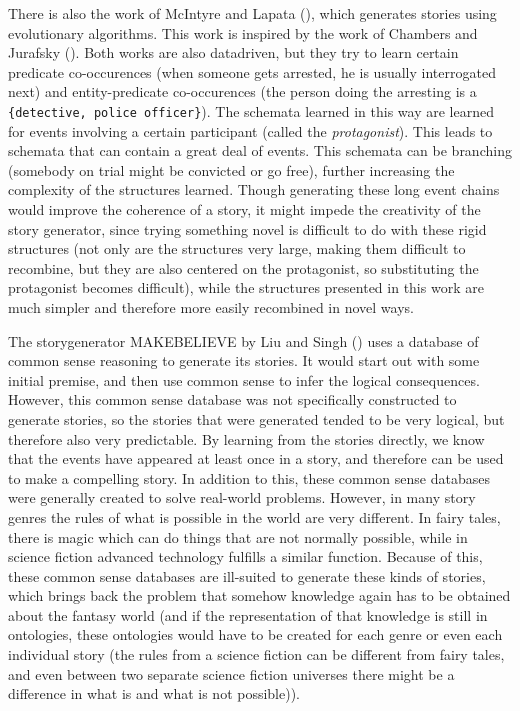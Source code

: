 There is also the work of McIntyre and Lapata (\cite{McIntyre2010}), which
generates stories using evolutionary algorithms. This work is inspired by the
work of Chambers and Jurafsky (\cite{chambers2009unsupervised}). Both works are
also datadriven, but they try to learn certain predicate co-occurences (when someone
gets arrested, he is usually interrogated next) and entity-predicate
co-occurences (the person doing the arresting is a \texttt{\{detective, police
officer\}}). The schemata learned in this way are learned for events involving a
certain participant (called the \emph{protagonist}). This leads to schemata that
can contain a great deal of events. This schemata can be branching (somebody on trial
might be convicted or go free), further increasing the complexity of the
structures learned.
Though generating these long event chains would improve the coherence of a story, 
it might impede the creativity of the story generator, since trying something novel is
difficult to do with these rigid structures (not only are the structures very
large, making them difficult to recombine, but they are also centered on the
protagonist, so substituting the protagonist becomes difficult), while the structures presented in
this work are much simpler and therefore more easily recombined in novel ways.

The storygenerator MAKEBELIEVE by Liu and Singh (\cite{liu2002makebelieve}) uses
a database of common sense reasoning to generate its stories. It would start out
with some initial premise, and then use common sense to infer the logical
consequences. However, this common sense
database was not specifically constructed to generate stories, so the stories
that were generated tended to be very logical, but therefore also very
predictable. By
learning from the stories directly, we know that the events have appeared at
least once in a story, and therefore can be used to make a compelling story.
In addition to this, these common sense databases were generally created to
solve real-world problems. However, in many story genres
the rules of what is possible in the world are very different. In fairy tales,
there is magic which can do things that are not normally possible, while in science fiction
advanced technology fulfills a similar function. Because of this, these common sense
databases are ill-suited to generate these kinds of stories, which brings back
the problem that somehow knowledge again has to be obtained about the fantasy
world (and if the representation of that knowledge is still in ontologies,
these ontologies would have to be created for each genre or even each individual
story (the rules from a science fiction can be different from fairy tales, and
even between two separate science fiction universes there might be a difference
in what is and what is not possible)).

